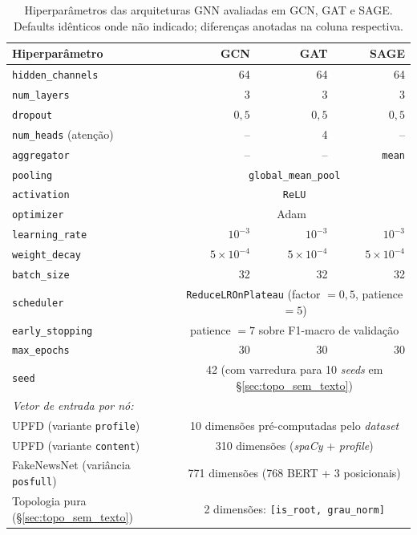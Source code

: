 \begin{table}[H]\centering
\caption{Hiperpar\^ametros das arquiteturas GNN avaliadas em GCN, GAT e
SAGE. Defaults id\^enticos onde n\~ao indicado; diferen\c{c}as anotadas
na coluna respectiva.}
\label{tab:hp_gnn}
\small
\begin{tabular}{lrrr}
\toprule
\textbf{Hiperpar\^ametro} & \textbf{GCN} & \textbf{GAT} & \textbf{SAGE} \\
\midrule
\texttt{hidden\_channels}        & 64    & 64    & 64 \\
\texttt{num\_layers}             & 3     & 3     & 3 \\
\texttt{dropout}                 & $0{,}5$ & $0{,}5$ & $0{,}5$ \\
\texttt{num\_heads} (aten\c{c}\~ao) & --   & 4     & -- \\
\texttt{aggregator}              & --    & --    & \texttt{mean} \\
\texttt{pooling}                 & \multicolumn{3}{c}{\texttt{global\_mean\_pool}} \\
\texttt{activation}              & \multicolumn{3}{c}{\texttt{ReLU}} \\
\texttt{optimizer}               & \multicolumn{3}{c}{Adam~\cite{kingma2015adam}} \\
\texttt{learning\_rate}          & $10^{-3}$ & $10^{-3}$ & $10^{-3}$ \\
\texttt{weight\_decay}           & $5 \times 10^{-4}$ & $5 \times 10^{-4}$ & $5 \times 10^{-4}$ \\
\texttt{batch\_size}             & 32    & 32    & 32 \\
\texttt{scheduler}               & \multicolumn{3}{c}{\texttt{ReduceLROnPlateau} (factor $= 0{,}5$, patience $= 5$)} \\
\texttt{early\_stopping}         & \multicolumn{3}{c}{patience $= 7$ sobre F1-macro de valida\c{c}\~ao} \\
\texttt{max\_epochs}             & 30    & 30    & 30 \\
\texttt{seed}                    & \multicolumn{3}{c}{42 (com varredura para 10 \emph{seeds} em \S\ref{sec:topo_sem_texto})} \\
\midrule
\multicolumn{4}{l}{\emph{Vetor de entrada por n\'o:}} \\
\quad UPFD (variante \texttt{profile})       & \multicolumn{3}{c}{10 dimens\~oes pr\'e-computadas pelo \emph{dataset}} \\
\quad UPFD (variante \texttt{content})       & \multicolumn{3}{c}{310 dimens\~oes (\emph{spaCy} + \emph{profile})} \\
\quad FakeNewsNet (vari\^ancia \texttt{posfull}) & \multicolumn{3}{c}{771 dimens\~oes (768 BERT + 3 posicionais)} \\
\quad Topologia pura (\S\ref{sec:topo_sem_texto}) & \multicolumn{3}{c}{2 dimens\~oes: \texttt{[is\_root, grau\_norm]}} \\
\bottomrule
\end{tabular}
\end{table}

